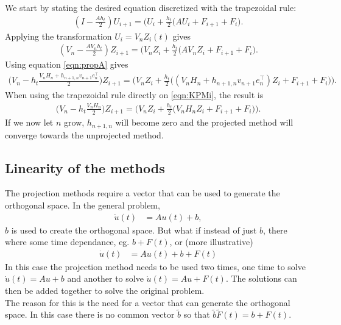 We start by stating the desired equation discretized with the trapezoidal rule:
\begin{equation*}
\begin{aligned}
(I-\frac{Ah_t}{2}) U_{i+1} = \Big( U_i + \frac{h_t}{2} \big( A U_i + F_{i+1} +F_{i} \big).
\end{aligned}
\end{equation*}
Applying the transformation $ U_i = V_n Z_i(t) $ gives
\begin{equation*}
\begin{aligned}
(V_n-\frac{A V_n h_t}{2}) Z_{i+1} = \Big( V_n Z_i + \frac{h_t}{2} \big( A V_n Z_i + F_{i+1} +F_{i} \big).
\end{aligned}
\end{equation*}
Using equation \eqref{eqn:propA} gives
\begin{equation*}
\begin{aligned}
\Big(V_n-h_t\frac{V_n H_n + h_{n+1,n}v_{n+1} e_n^\top }{2}\Big) Z_{i+1} = \Big( V_n Z_i + \frac{h_t}{2} \big( (V_n H_n + h_{n+1,n}v_{n+1} e_n^\top) Z_i + F_{i+1} +F_{i} \big) \Big).
\end{aligned}
\end{equation*}
When using the trapezoidal rule directly on \eqref{eqn:KPMi}, the result is
\begin{equation*}
\begin{aligned}
\Big(V_n-h_t\frac{V_n H_n}{2}\Big) Z_{i+1} = \Big( V_n Z_i + \frac{h_t}{2} \big( V_n H_n Z_i + F_{i+1} +F_{i} \big) \Big).
\end{aligned}
\end{equation*}
If we now let $n$ grow, $h_{n+1,n}$ will become zero and the projected method will converge towards the unprojected method. 
\subsection{Linearity of the methods} %
The projection methods require a vector that can be used to generate the orthogonal space. In the general problem,
\begin{equation}
\begin{aligned}
\dot{u}(t) &= Au(t) + b,
\end{aligned}
\end{equation} 
$b$ is used to create the orthogonal space. But what if instead of just $b$, there where some time dependance, eg. $b + F(t)$, or (more illustrative)
\begin{equation}
\begin{aligned}
\dot{u}(t) &= Au(t) + b + F(t)
\end{aligned}
\end{equation} 
In this case the projection method needs to be used two times, one time to solve $ \dot{u}(t) = Au + b $ and another to solve $ \dot{u}(t) = Au + F(t) $. The solutions can then be added together to solve the original problem. \\
The reason for this is the need for a vector that can generate the orthogonal space. In this case there is no common vector $\tilde{b}$ so that $\tilde{b} \tilde{F}(t) = b + F(t)$. \\


